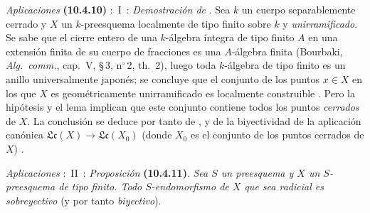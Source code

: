 \begin{env}[10.4.10]
\label{IV.10.4.10}
\emph{Aplicaciones} \textbf{(10.4.10)} :~I~: \emph{Demostración de} .
Sea $k$ un cuerpo separablemente cerrado y $X$ un $k$-preesquema localmente de tipo finito sobre $k$ y \emph{unirramificado}.
Se sabe que el cierre entero de una $k$-álgebra íntegra de tipo finito $A$ en una extensión finita de su cuerpo de fracciones es una $A$-álgebra finita (Bourbaki, \emph{Alg.\ comm.}, cap.~V, \S\,3, n$^\circ$\,2, th.~2), luego toda $k$-álgebra de tipo finito es un anillo universalmente japonés; se concluye que el conjunto de los puntos $x\in X$ en los que $X$ es geométricamente unirramificado es localmente construible .
Pero la hipótesis y el lema  implican que este conjunto contiene todos los puntos \emph{cerrados} de $X$.
La conclusión se deduce por tanto de ,  y de la biyectividad de la aplicación canónica $\mathfrak{Lc}(X)\to\mathfrak{Lc}(X_0)$ (donde $X_0$ es el conjunto de los puntos cerrados de $X$) .
\end{env}

\begin{env}[10.4.11]
\label{IV.10.4.11}

\emph{Aplicaciones} :~II~: \emph{Proposición} \textbf{(10.4.11)}.
\emph{Sea $S$ un preesquema y $X$ un $S$-preesquema de tipo finito.
Todo $S$-endomorfismo de $X$ que sea radicial es sobreyectivo} (y por tanto \emph{biyectivo}).
\end{env}




